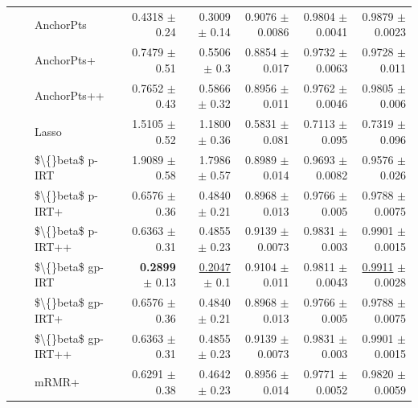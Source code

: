 \begin{longtable}{llp{}rrrrr}
 &  & AnchorPts & 0.4318 {\scriptsize $\pm$ 0.24} & 0.3009 {\scriptsize $\pm$ 0.14} & 0.9076 {\scriptsize $\pm$ 0.0086} & 0.9804 {\scriptsize $\pm$ 0.0041} & 0.9879 {\scriptsize $\pm$ 0.0023} \\
 &  & AnchorPts+ & 0.7479 {\scriptsize $\pm$ 0.51} & 0.5506 {\scriptsize $\pm$ 0.3} & 0.8854 {\scriptsize $\pm$ 0.017} & 0.9732 {\scriptsize $\pm$ 0.0063} & 0.9728 {\scriptsize $\pm$ 0.011} \\
 &  & AnchorPts++ & 0.7652 {\scriptsize $\pm$ 0.43} & 0.5866 {\scriptsize $\pm$ 0.32} & 0.8956 {\scriptsize $\pm$ 0.011} & 0.9762 {\scriptsize $\pm$ 0.0046} & 0.9805 {\scriptsize $\pm$ 0.006} \\
 &  & Lasso & 1.5105 {\scriptsize $\pm$ 0.52} & 1.1800 {\scriptsize $\pm$ 0.36} & 0.5831 {\scriptsize $\pm$ 0.081} & 0.7113 {\scriptsize $\pm$ 0.095} & 0.7319 {\scriptsize $\pm$ 0.096} \\
 &  & \$\textbackslash\{\}beta\$ p-IRT & 1.9089 {\scriptsize $\pm$ 0.58} & 1.7986 {\scriptsize $\pm$ 0.57} & 0.8989 {\scriptsize $\pm$ 0.014} & 0.9693 {\scriptsize $\pm$ 0.0082} & 0.9576 {\scriptsize $\pm$ 0.026} \\
 &  & \$\textbackslash\{\}beta\$ p-IRT+ & 0.6576 {\scriptsize $\pm$ 0.36} & 0.4840 {\scriptsize $\pm$ 0.21} & 0.8968 {\scriptsize $\pm$ 0.013} & 0.9766 {\scriptsize $\pm$ 0.005} & 0.9788 {\scriptsize $\pm$ 0.0075} \\
 &  & \$\textbackslash\{\}beta\$ p-IRT++ & 0.6363 {\scriptsize $\pm$ 0.31} & 0.4855 {\scriptsize $\pm$ 0.23} & 0.9139 {\scriptsize $\pm$ 0.0073} & 0.9831 {\scriptsize $\pm$ 0.003} & 0.9901 {\scriptsize $\pm$ 0.0015} \\
 &  & \$\textbackslash\{\}beta\$ gp-IRT & \textbf{0.2899} {\scriptsize $\pm$ 0.13} & \underline{0.2047} {\scriptsize $\pm$ 0.1} & 0.9104 {\scriptsize $\pm$ 0.011} & 0.9811 {\scriptsize $\pm$ 0.0043} & \underline{0.9911} {\scriptsize $\pm$ 0.0028} \\
 &  & \$\textbackslash\{\}beta\$ gp-IRT+ & 0.6576 {\scriptsize $\pm$ 0.36} & 0.4840 {\scriptsize $\pm$ 0.21} & 0.8968 {\scriptsize $\pm$ 0.013} & 0.9766 {\scriptsize $\pm$ 0.005} & 0.9788 {\scriptsize $\pm$ 0.0075} \\
 &  & \$\textbackslash\{\}beta\$ gp-IRT++ & 0.6363 {\scriptsize $\pm$ 0.31} & 0.4855 {\scriptsize $\pm$ 0.23} & 0.9139 {\scriptsize $\pm$ 0.0073} & 0.9831 {\scriptsize $\pm$ 0.003} & 0.9901 {\scriptsize $\pm$ 0.0015} \\
 &  & mRMR+ & 0.6291 {\scriptsize $\pm$ 0.38} & 0.4642 {\scriptsize $\pm$ 0.23} & 0.8956 {\scriptsize $\pm$ 0.014} & 0.9771 {\scriptsize $\pm$ 0.0052} & 0.9820 {\scriptsize $\pm$ 0.0059} \\

\end{longtable}
